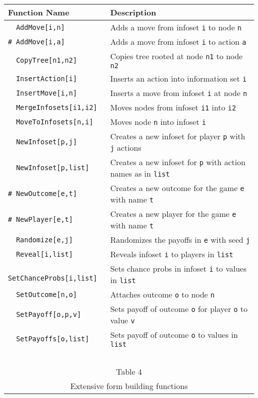 \begin{table}[htp]
\begin{center}
\begin{tabular} {|l||l|} \hline
Function Name	& Description \\ 
\hline
\verb+  AddMove[i,n]+ &Adds a move from infoset \verb+i+ to node \verb+n+ \\
\verb+# AddMove[i,a]+ &Adds a move from infoset \verb+i+ to action \verb+a+ \\
\verb+  CopyTree[n1,n2]+ &Copies tree rooted at node \verb+n1+ to node \verb+n2+ \\
\verb+  InsertAction[i]+ &Inserts an action into information set \verb+i+ \\
\verb+  InsertMove[i,n]+ &Inserts a move from infoset \verb+i+ at node \verb+n+\\
\verb+  MergeInfosets[i1,i2]+ &Moves nodes from infoset \verb+i1+ into \verb+i2+\\
\verb+  MoveToInfosets[n,i]+ &Moves node \verb+n+ into infoset \verb+i+\\
\verb+  NewInfoset[p,j]+ &Creates a new infoset for player \verb+p+ with \verb+j+ actions\\
\verb+  NewInfoset[p,list]+ &Creates a new infoset for \verb+p+ with action names as in \verb+list+\\
\verb+# NewOutcome[e,t]+ &Creates a new outcome for the game \verb+e+
with name \verb+t+\\
\verb+# NewPlayer[e,t]+ &Creates a new player for the game \verb+e+
with name \verb+t+\\
\verb+  Randomize[e,j]+ &Randomizes the payoffs in \verb+e+ with seed \verb+j+\\
\verb+  Reveal[i,list]+ &Reveals infoset \verb+i+ to players in \verb+list+\\
\verb+  SetChanceProbs[i,list]+ &Sets chance probs in infoset \verb+i+ to values in \verb+list+\\
\verb+  SetOutcome[n,o]+ &Attaches outcome \verb+o+ to node \verb+n+ \\
\verb+  SetPayoff[o,p,v]+ &Sets payoff of outcome \verb+o+ for player \verb+o+ to value \verb+v+\\
\verb+  SetPayoffs[o,list]+ &Sets payoff of outcome \verb+o+ to values in \verb+list+\\
\hline
\multicolumn{2}{c}{\ }\\
\multicolumn{2}{c}{Table 4}\\
\multicolumn{2}{c}{Extensive form building functions}\\
\end{tabular}
\end{center}
\end{table}
\medskip

